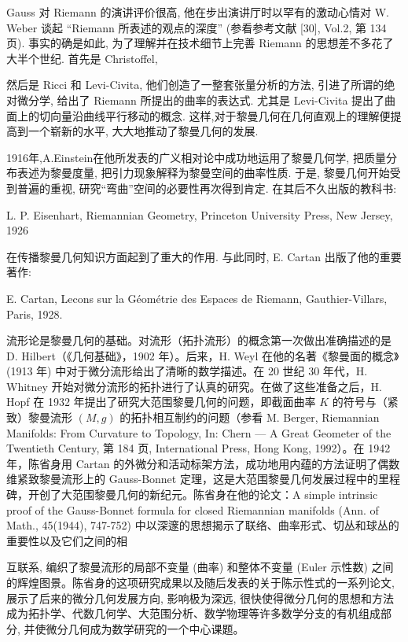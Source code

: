 Gauss 对 Riemann 的演讲评价很高, 他在步出演讲厅时以罕有的激动心情对 W. Weber 谈起 “Riemann 所表述的观点的深度” (参看参考文献 [30], Vol.2, 第 134 页). 事实的确是如此, 为了理解并在技术细节上完善 Riemann 的思想差不多花了大半个世纪. 首先是 Christoffel,

然后是 Ricci 和 Levi-Civita, 他们创造了一整套张量分析的方法, 引进了所谓的绝对微分学, 给出了 Riemann 所提出的曲率的表达式. 尤其是 Levi-Civita 提出了曲面上的切向量沿曲线平行移动的概念. 这样,对于黎曼几何在几何直观上的理解便提高到一个崭新的水平, 大大地推动了黎曼几何的发展.

1916年,A.Einstein在他所发表的广义相对论中成功地运用了黎曼几何学, 把质量分布表述为黎曼度量, 把引力现象解释为黎曼空间的曲率性质. 于是, 黎曼几何开始受到普遍的重视, 研究“弯曲”空间的必要性再次得到肯定. 在其后不久出版的教科书:

L. P. Eisenhart, Riemannian Geometry, Princeton University Press, New Jersey, 1926

在传播黎曼几何知识方面起到了重大的作用. 与此同时, E. Cartan 出版了他的重要著作:

E. Cartan, Lecons sur la Géométrie des Espaces de Riemann, Gauthier-Villars, Paris, 1928.

流形论是黎曼几何的基础。对流形（拓扑流形）的概念第一次做出准确描述的是 D. Hilbert（《几何基础》，1902 年）。后来，H. Weyl 在他的名著《黎曼面的概念》(1913 年) 中对于微分流形给出了清晰的数学描述。在 20 世纪 30 年代，H. Whitney 开始对微分流形的拓扑进行了认真的研究。在做了这些准备之后，H. Hopf 在 1932 年提出了研究大范围黎曼几何的问题，即截面曲率  $K$  的符号与（紧致）黎曼流形  $(M, g)$  的拓扑相互制约的问题（参看 M. Berger, Riemannian Manifolds: From Curvature to Topology, In: Chern — A Great Geometer of the Twentieth Century, 第 184 页, International Press, Hong Kong, 1992）。在 1942 年，陈省身用 Cartan 的外微分和活动标架方法，成功地用内蕴的方法证明了偶数维紧致黎曼流形上的 Gauss-Bonnet 定理，这是大范围黎曼几何发展过程中的里程碑，开创了大范围黎曼几何的新纪元。陈省身在他的论文：A simple intrinsic proof of the Gauss-Bonnet formula for closed Riemannian manifolds (Ann. of Math., 45(1944), 747-752) 中以深邃的思想揭示了联络、曲率形式、切丛和球丛的重要性以及它们之间的相

互联系, 编织了黎曼流形的局部不变量 (曲率) 和整体不变量 (Euler 示性数) 之间的辉煌图景。陈省身的这项研究成果以及随后发表的关于陈示性式的一系列论文, 展示了后来的微分几何发展方向, 影响极为深远, 很快使得微分几何的思想和方法成为拓扑学、代数几何学、大范围分析、数学物理等许多数学分支的有机组成部分, 并使微分几何成为数学研究的一个中心课题。

